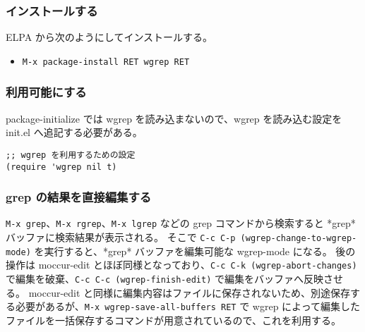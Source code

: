 \subsubsection{インストールする}
ELPA から次のようにしてインストールする。
\begin{itemize}\setlength{\leftskip}{-1.00zw}%
\item[] \texttt{M-x package-install RET wgrep RET}
\end{itemize}
\subsubsection{利用可能にする}
package-initialize では wgrep を読み込まないので、wgrep を読み込む設定を init.el へ追記する必要がある。
\begin{mdframed}[roundcorner=0.50zw,leftmargin=3.00zw,rightmargin=3.00zw,skipabove=0.40zw,skipbelow=0.40zw,innertopmargin=4.00pt,innerbottommargin=4.00pt,innerleftmargin=5.00pt,innerrightmargin=5.00pt,linecolor=gray!020,linewidth=0.50pt,backgroundcolor=gray!20]
\begin{verbatim}
;; wgrep を利用するための設定
(require 'wgrep nil t)
\end{verbatim}
\end{mdframed}
\subsubsection{grep の結果を直接編集する}
\texttt{M-x grep}、\texttt{M-x rgrep}、\texttt{M-x lgrep} などの grep コマンドから検索すると *grep* バッファに検索結果が表示される。
そこで \texttt{C-c C-p (wgrep-change-to-wgrep-mode)} を実行すると、*grep* バッファを編集可能な wgrep-mode になる。
後の操作は moccur-edit とほぼ同様となっており、\texttt{C-c C-k (wgrep-abort-changes)} で編集を破棄、\texttt{C-c C-c (wgrep-finish-edit)} で編集をバッファへ反映させる。
moccur-edit と同様に編集内容はファイルに保存されないため、別途保存する必要があるが、\texttt{M-x wgrep-save-all-buffers RET} で wgrep によって編集したファイルを一括保存するコマンドが用意されているので、これを利用する。
